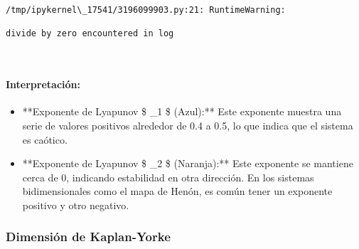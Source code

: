 \documentclass[11pt]{article}
\providecommand{\tightlist}{%
      \setlength{\itemsep}{0pt}\setlength{\parskip}{0pt}}
\begin{document}
    \begin{Verbatim}[commandchars=\\\{\}]
/tmp/ipykernel\_17541/3196099903.py:21: RuntimeWarning:

divide by zero encountered in log

    \end{Verbatim}

    \begin{center}
    \end{center}
    { \hspace*{\fill} \\}
    
    \hypertarget{interpretaciuxf3n}{%
\paragraph{Interpretación:}\label{interpretaciuxf3n}}

\begin{itemize}
\tightlist
\item
  **Exponente de Lyapunov \$ \lambda\_1 \$ (Azul):** Este exponente
  muestra una serie de valores positivos alrededor de 0.4 a 0.5, lo que
  indica que el sistema es caótico.
\item
  **Exponente de Lyapunov \$ \lambda\_2 \$ (Naranja):** Este exponente
  se mantiene cerca de 0, indicando estabilidad en otra dirección. En
  los sistemas bidimensionales como el mapa de Henón, es común tener un
  exponente positivo y otro negativo.
\end{itemize}

    \hypertarget{dimensiuxf3n-de-kaplan-yorke}{%
\subsubsection{Dimensión de
Kaplan-Yorke}\label{dimensiuxf3n-de-kaplan-yorke}}
\end{document}
